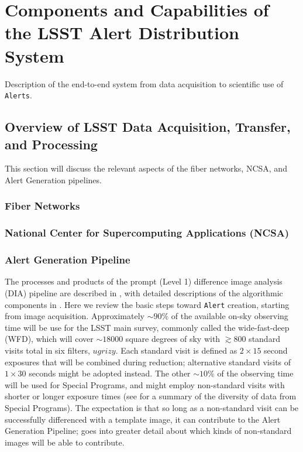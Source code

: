 \section{Components and Capabilities of the LSST Alert Distribution System}\label{sec:components}

Description of the end-to-end system from data acquisition to scientific use of {\tt Alerts}.

\subsection{Overview of LSST Data Acquisition, Transfer, and Processing}

This section will discuss the relevant aspects of the fiber networks, NCSA, and Alert Generation pipelines.

\subsubsection{Fiber Networks}

\subsubsection{National Center for Supercomputing Applications (NCSA)}

\subsubsection{Alert Generation Pipeline}\label{sssec:AGP}


The processes and products of the prompt (Level 1) difference image analysis (DIA) pipeline are described in , with detailed descriptions of the algorithmic components in . Here we review the basic steps toward {\tt Alert} creation, starting from image acquisition. Approximately $\sim90\%$ of the available on-sky observing time will be use for the LSST main survey, commonly called the wide-fast-deep (WFD), which will cover $\sim18000$ square degrees of sky with $\gtrsim800$ standard visits total in six filters, $ugrizy$. Each standard visit is defined as $2\times15$ second exposures that will be combined during reduction; alternative standard visits of $1\times30$ seconds might be adopted instead. The other $\sim10\%$ of the observing time will be used for Special Programs, and might employ non-standard visits with shorter or longer exposure times (see  for a summary of the diversity of data from Special Programs). The expectation is that so long as a non-standard visit can be successfully differenced with a template image, it can contribute to the Alert Generation Pipeline;  goes into greater detail about which kinds of non-standard images will be able to contribute.

